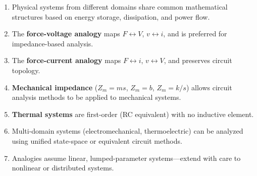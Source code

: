\begin{keyconceptbox}[title=Chapter Summary: System Analogies]
\begin{enumerate}
    \item Physical systems from different domains share common mathematical structures based on energy storage, dissipation, and power flow.

    \item The \textbf{force-voltage analogy} maps $F \leftrightarrow V$, $v \leftrightarrow i$, and is preferred for impedance-based analysis.

    \item The \textbf{force-current analogy} maps $F \leftrightarrow i$, $v \leftrightarrow V$, and preserves circuit topology.

    \item \textbf{Mechanical impedance} ($Z_m = ms$, $Z_m = b$, $Z_m = k/s$) allows circuit analysis methods to be applied to mechanical systems.

    \item \textbf{Thermal systems} are first-order (RC equivalent) with no inductive element.

    \item Multi-domain systems (electromechanical, thermoelectric) can be analyzed using unified state-space or equivalent circuit methods.

    \item Analogies assume linear, lumped-parameter systems---extend with care to nonlinear or distributed systems.
\end{enumerate}
\end{keyconceptbox}

